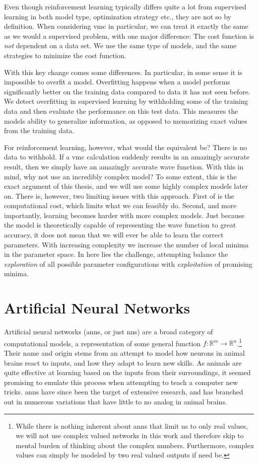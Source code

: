 \documentclass[Thesis.tex]{subfiles}
\begin{document}
Even though reinforcement learning typically differs quite a lot from supervised
learning in both model type, optimization strategy etc., they are not so
by definition. When considering \gls{vmc} in particular, we can treat
it exactly the same as we would a supervised problem, with one major difference:
The cost function is \emph{not} dependent on a data set. We use the same type
of models, and the same strategies to minimize the cost function.

With this key change comes some differences. In particular, in some sense it
is impossible to overfit a model. Overfitting happens when a model performs
significantly better on the training data compared to data it has not seen
before. We detect overfitting in supervised learning by withholding some of
the training data and then evaluate the performance on this test data. This
measures the models ability to generalize information, as opposed to memorizing
exact values from the training data.

For reinforcement learning, however, what would the equivalent be? There is no
data to withhold. If a \gls{vmc} calculation suddenly results in an amazingly accurate
result, then we simply have an amazingly accurate wave
function. With this in
mind, why not use an incredibly complex model? To some extent, this is the exact
argument of this thesis, and we will use some highly complex models later on.
There is, however, two limiting issues with this approach. First of is the
computational cost, which limits what we can feasibly do. Second, and more
importantly, learning becomes harder with more complex models. Just because the
model is theoretically capable of representing the wave function to great
accuracy, it does not mean that we will ever be able to learn the correct
parameters. With increasing complexity we increase the number of local
minima in the parameter space. In here lies the challenge, attempting balance
the \emph{exploration} of all possible parameter configurations with \emph{exploitation} of
promising minima.


\section{Artificial Neural Networks}
\label{sec:artificial-neural-networks}
Artificial neural networks (\glspl{ann}, or just \glspl{nn}) are a broad category of
computational models, a representation of some general function $f:
\mathbb{R}^m\to\mathbb{R}^n$.\footnote{While there is nothing inherent about
  \glspl{ann} that limit us to only real values, we will not use
  complex valued networks in this work and therefore skip to mental burden of
  thinking about the complex numbers. Furthermore, complex values can simply be
  modeled by two real valued outputs if need be.} Their name and origin stems from an attempt to
model how neurons in animal brains react to inputs, and how they adapt to learn
new skills. As animals are quite effective at learning based on the inputs from
their surroundings, it seemed promising to emulate this
process when attempting to teach a computer new tricks. \Glspl{ann} have since been the
target of extensive research, and has branched out in numerous variations that
have little to no analog in animal brains.
\end{document}
